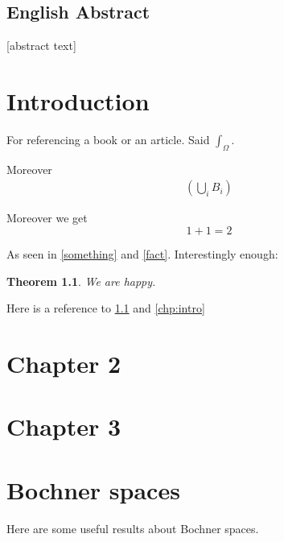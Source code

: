 \documentclass[english,a4paper,12pt,oneside]{scrbook}
\theoremstyle{break}
\newtheorem{thm}[equation]{Theorem}
\theoremstyle{remark}
\newcommand{\ds}{\displaystyle}
\begin{document}
\section*{English Abstract}
[abstract text]
\newpage
\tableofcontents  


\chapter{Introduction}  \setcounter{page}{1}   %
\label{chp:intro}
For referencing a book or an article. Said $ \ds \int_\Omega $.

Moreover 
\begin{align}
\label{something}
\left ( \bigcup_i B_i \right )
\end{align}

Moreover we get 
\begin{equation}
\label{fact}
	1+1=2
\end{equation}

As seen in \ref{something} and \cref{fact}. Interestingly enough:

\begin{thm}
\label{thm:obvious}
	We are happy.
\end{thm}

Here is a reference to \cref{thm:obvious} and \cref{chp:intro}

\chapter{Chapter 2}

\chapter{Chapter 3}

\appendix

\chapter{Bochner spaces}

Here are some useful results about Bochner spaces.
\end{document}
